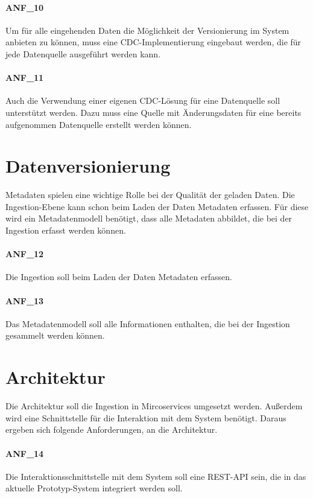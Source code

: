 \paragraph{ANF\_10}
\label{ANF_10}
Um für alle eingehenden Daten die Möglichkeit der Versionierung im System anbieten zu können, muss eine CDC-Implementierung eingebaut werden, die für jede Datenquelle ausgeführt werden kann.

\paragraph{ANF\_11}
\label{ANF_11}
Auch die Verwendung einer eigenen CDC-Lösung für eine Datenquelle soll unterstützt werden.
Dazu muss eine Quelle mit Änderungsdaten für eine bereits aufgenommen Datenquelle erstellt werden können.

\section{Datenversionierung}
\label{sec:anf-metadata}
Metadaten spielen eine wichtige Rolle bei der Qualität der geladen Daten.
Die Ingestion-Ebene kann schon beim Laden der Daten Metadaten erfassen.
Für diese wird ein Metadatenmodell benötigt, dass alle Metadaten abbildet, die bei der Ingestion erfasst werden können.

\paragraph{ANF\_12}
\label{ANF_12}
Die Ingestion soll beim Laden der Daten Metadaten erfassen.

\paragraph{ANF\_13}
\label{ANF_13}
Das Metadatenmodell soll alle Informationen enthalten, die bei der Ingestion gesammelt werden können.

\section{Architektur}
\label{sec:anf-arch}
Die Architektur soll die Ingestion in Mircoservices umgesetzt werden.
Außerdem wird eine Schnittstelle für die Interaktion mit dem System benötigt.
Daraus ergeben sich folgende Anforderungen, an die Architektur.

\paragraph{ANF\_14}
\label{ANF_14}
Die Interaktionsschnittstelle mit dem System soll eine REST-API sein, die in das aktuelle Prototyp-System integriert werden soll.

